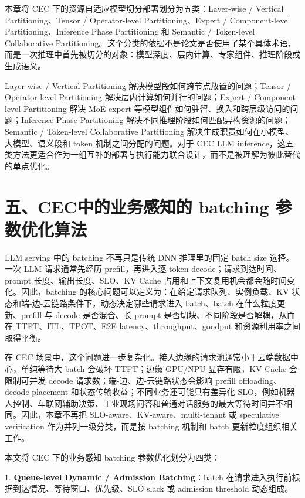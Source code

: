 \documentclass[a4paper,twocolumn,10pt]{ctexart}
\begin{document}
本章将 CEC 下的资源自适应模型切分部署划分为五类：Layer-wise / Vertical Partitioning、Tensor / Operator-level Partitioning、Expert / Component-level Partitioning、Inference Phase Partitioning 和 Semantic / Token-level Collaborative Partitioning。这个分类的依据不是论文是否使用了某个具体术语，而是一次推理中首先被切分的对象：模型深度、层内计算、专家组件、推理阶段或生成语义。


Layer-wise / Vertical Partitioning 解决模型段如何跨节点放置的问题；Tensor / Operator-level Partitioning 解决层内计算如何并行的问题；Expert / Component-level Partitioning 解决 MoE expert 等模型组件如何驻留、换入和跨层级访问的问题；Inference Phase Partitioning 解决不同推理阶段如何匹配异构资源的问题；Semantic / Token-level Collaborative Partitioning 解决生成职责如何在小模型、大模型、语义段和 token 机制之间分配的问题。对于 CEC LLM inference，这五类方法更适合作为一组互补的部署与执行能力联合设计，而不是被理解为彼此替代的单点优化。




\section{五、CEC中的业务感知的 batching 参数优化算法}

LLM serving 中的 batching 不再只是传统 DNN 推理里的固定 batch size 选择。一次 LLM 请求通常先经历 prefill，再进入逐 token decode；请求到达时间、prompt 长度、输出长度、SLO、KV Cache 占用和上下文复用机会都会随时间变化。因此，batching 的核心问题可以定义为：在给定请求队列、实例负载、KV 状态和端-边-云链路条件下，动态决定哪些请求进入 batch、batch 在什么粒度更新、prefill 与 decode 是否混合、长 prompt 是否切块、不同阶段是否解耦，从而在 TTFT、ITL、TPOT、E2E latency、throughput、goodput 和资源利用率之间取得平衡。


在 CEC 场景中，这个问题进一步复杂化。接入边缘的请求池通常小于云端数据中心，单纯等待大 batch 会破坏 TTFT；边缘 GPU/NPU 显存有限，KV Cache 会限制可并发 decode 请求数；端-边、边-云链路状态会影响 prefill offloading、decode placement 和状态传输收益；不同业务还可能具有差异化 SLO，例如机器人控制、车联网辅助决策、工业现场问答和普通对话服务的最大等待时间并不相同。因此，本章不再把 SLO-aware、KV-aware、multi-tenant 或 speculative verification 作为并列一级分类，而是按 batching 机制和 batch 更新粒度组织相关工作。


本文将 CEC 下的业务感知 batching 参数优化划分为四类：


1. \textbf{Queue-level Dynamic / Admission Batching}：batch 在请求进入执行前根据到达情况、等待窗口、优先级、SLO slack 或 admission threshold 动态组成。
\end{document}
